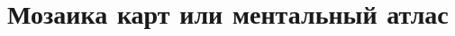 \documentclass[a4paper,14pt]{extreport}
\begin{document}


\chapter{Мозаика карт или ментальный атлас} \label{chapt1}




\end{document}
